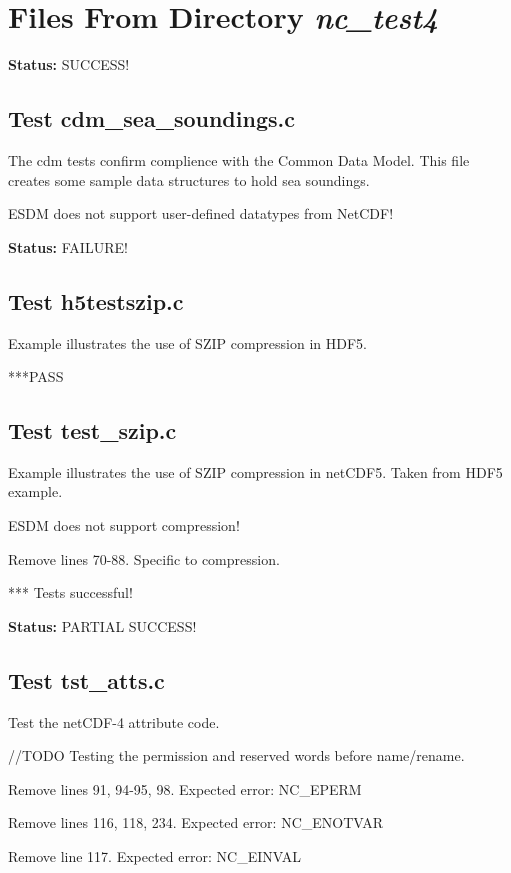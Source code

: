 \chapter{Files From Directory {\textit{nc\_test4}}}

{\bf \large Status: } SUCCESS!

\section{Test cdm\_sea\_soundings.c}

The cdm tests confirm complience with the Common Data Model. This
file creates some sample data structures to hold sea soundings.

ESDM does not support user-defined datatypes from NetCDF!

{\bf \large Status: } FAILURE!

\section{Test h5testszip.c}

Example illustrates the use of SZIP compression in HDF5.

***PASS

\section{Test test\_szip.c}

Example illustrates the use of SZIP compression in netCDF5.
Taken from HDF5 example.

ESDM does not support compression!

Remove lines 70-88. Specific to compression.

*** Tests successful!

{\bf \large Status: } PARTIAL SUCCESS!

\section{Test tst\_atts.c}

Test the netCDF-4 attribute code.

//TODO Testing the permission and reserved words before name/rename.

Remove lines 91, 94-95, 98. Expected error: NC\_EPERM

Remove lines 116, 118, 234. Expected error: NC\_ENOTVAR

Remove line 117. Expected error: NC\_EINVAL


